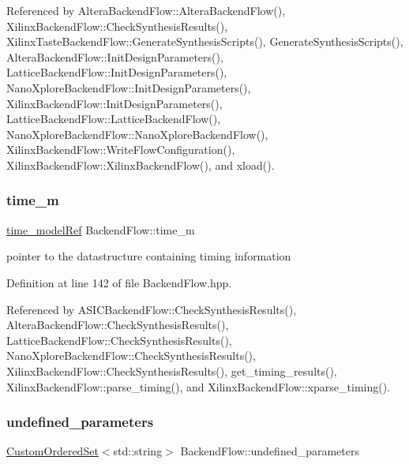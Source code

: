 Referenced by Altera\+Backend\+Flow\+::\+Altera\+Backend\+Flow(), Xilinx\+Backend\+Flow\+::\+Check\+Synthesis\+Results(), Xilinx\+Taste\+Backend\+Flow\+::\+Generate\+Synthesis\+Scripts(), Generate\+Synthesis\+Scripts(), Altera\+Backend\+Flow\+::\+Init\+Design\+Parameters(), Lattice\+Backend\+Flow\+::\+Init\+Design\+Parameters(), Nano\+Xplore\+Backend\+Flow\+::\+Init\+Design\+Parameters(), Xilinx\+Backend\+Flow\+::\+Init\+Design\+Parameters(), Lattice\+Backend\+Flow\+::\+Lattice\+Backend\+Flow(), Nano\+Xplore\+Backend\+Flow\+::\+Nano\+Xplore\+Backend\+Flow(), Xilinx\+Backend\+Flow\+::\+Write\+Flow\+Configuration(), Xilinx\+Backend\+Flow\+::\+Xilinx\+Backend\+Flow(), and xload().

\mbox{\label{classBackendFlow_a9c4448096051a3bdbb829759234024d3}} 
\subsubsection{\texorpdfstring{time\+\_\+m}{time\_m}}
{\footnotesize\ttfamily \hyperlink{time__model_8hpp_ae203bb7faf1c278333f76fcc6ebe412c}{time\+\_\+model\+Ref} Backend\+Flow\+::time\+\_\+m\hspace{0.3cm}{\ttfamily [protected]}}



pointer to the datastructure containing timing information 



Definition at line 142 of file Backend\+Flow.\+hpp.



Referenced by A\+S\+I\+C\+Backend\+Flow\+::\+Check\+Synthesis\+Results(), Altera\+Backend\+Flow\+::\+Check\+Synthesis\+Results(), Lattice\+Backend\+Flow\+::\+Check\+Synthesis\+Results(), Nano\+Xplore\+Backend\+Flow\+::\+Check\+Synthesis\+Results(), Xilinx\+Backend\+Flow\+::\+Check\+Synthesis\+Results(), get\+\_\+timing\+\_\+results(), Xilinx\+Backend\+Flow\+::parse\+\_\+timing(), and Xilinx\+Backend\+Flow\+::xparse\+\_\+timing().

\mbox{\label{classBackendFlow_a874c2f1cf929d2ab0cf742aceff21a9d}} 
\subsubsection{\texorpdfstring{undefined\+\_\+parameters}{undefined\_parameters}}
{\footnotesize\ttfamily \hyperlink{classCustomOrderedSet}{Custom\+Ordered\+Set}$<$std\+::string$>$ Backend\+Flow\+::undefined\+\_\+parameters\hspace{0.3cm}{\ttfamily [protected]}}



